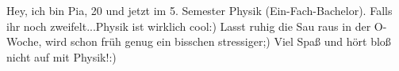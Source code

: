 \begin{multicols*}{2}
{Hey, ich bin Pia, 20 und jetzt im 5.  Semester Physik (Ein-Fach-Bachelor). Falls ihr noch zweifelt...Physik ist wirklich cool:) 
Lasst ruhig die Sau raus in der O-Woche, wird schon früh genug ein bisschen stressiger;) Viel Spaß und hört bloß nicht auf mit Physik!:)
}

\vspace{6ex}


\end{multicols*}
